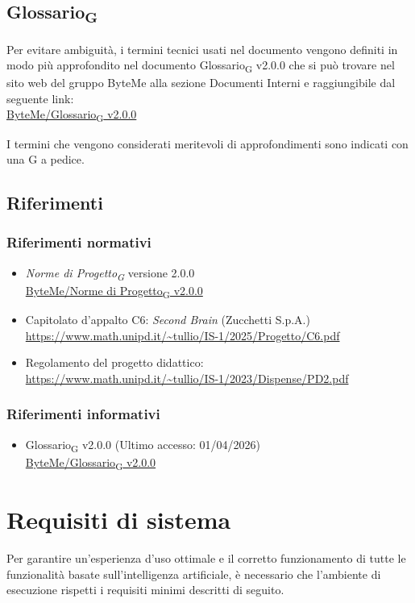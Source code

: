 \documentclass[11pt,a4paper]{article}
\newcommand{\gls}[1]{#1\textsubscript{G}}
\begin{document}
\subsection{\gls{Glossario}}
Per evitare ambiguità, i termini tecnici usati nel documento vengono definiti in modo più approfondito nel documento \gls{Glossario} v2.0.0 che si può trovare nel sito web del gruppo ByteMe alla sezione Documenti Interni e raggiungibile dal seguente link:\\
\href{https://byteme25.github.io/ByteMe/files.html}{ByteMe/\gls{Glossario} v2.0.0}

I termini che vengono considerati meritevoli di approfondimenti sono indicati con una G a pedice.


\subsection{Riferimenti}
\subsubsection{Riferimenti normativi}
\begin{itemize}
  \item \textit{\gls{Norme di Progetto}} versione 2.0.0\\
  \href{https://byteme25.github.io/ByteMe/files.html}{ByteMe/\gls{Norme di Progetto} v2.0.0}
  \item Capitolato d'appalto C6: \textit{Second Brain} (Zucchetti S.p.A.)\\ \url{https://www.math.unipd.it/~tullio/IS-1/2025/Progetto/C6.pdf}
  \item Regolamento del progetto didattico:\\
        \url{https://www.math.unipd.it/~tullio/IS-1/2023/Dispense/PD2.pdf}
\end{itemize}

\subsubsection{Riferimenti informativi}
\begin{itemize}
    \item \gls{Glossario} v2.0.0 (Ultimo accesso: 01/04/2026)\\
    \href{https://byteme25.github.io/ByteMe/files.html}{ByteMe/\gls{Glossario} v2.0.0}
\end{itemize}

\newpage

\section{Requisiti di sistema}
Per garantire un'esperienza d'uso ottimale e il corretto funzionamento di tutte le funzionalità basate sull'intelligenza artificiale, è necessario che l'ambiente di esecuzione rispetti i requisiti minimi descritti di seguito.
\end{document}
